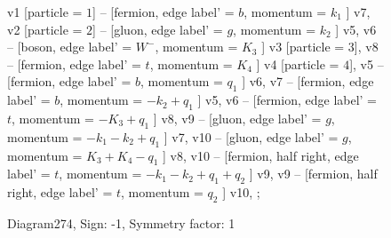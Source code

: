 \documentclass{revtex4}
\begin{document}
\begin{figure}[!htb]
\begin{center}
{    %
v1 [particle = \(1\)] -- [fermion, edge label' = \(b\), momentum = \(k_{1}\) ] v7, 
v2 [particle = \(2\)] -- [gluon, edge label' = \(g\), momentum = \(k_{2}\) ] v5, 
v6 -- [boson, edge label' = \(W^{-}\), momentum = \(K_{3}\) ] v3 [particle = \(3\)], 
v8 -- [fermion, edge label' = \(t\), momentum = \(K_{4}\) ] v4 [particle = \(4\)], 
v5 -- [fermion, edge label' = \(b\), momentum = \(q_{1}\) ] v6, 
v7 -- [fermion, edge label' = \(b\), momentum = \(-k_{2} + q_{1}\) ] v5, 
v6 -- [fermion, edge label' = \(t\), momentum = \(-K_{3} + q_{1}\) ] v8, 
v9 -- [gluon, edge label' = \(g\), momentum = \(-k_{1} - k_{2} + q_{1}\) ] v7, 
v10 -- [gluon, edge label' = \(g\), momentum = \(K_{3} + K_{4} - q_{1}\) ] v8, 
v10 -- [fermion, half right, edge label' = \(t\), momentum = \(-k_{1} - k_{2} + q_{1} + q_{2}\) ] v9, 
v9 -- [fermion, half right, edge label' = \(t\), momentum = \(q_{2}\) ] v10, 
};
\end{center}
\caption{Diagram274, Sign: -1, Symmetry factor: 1}
\end{figure}
\newpage
\end{document}
